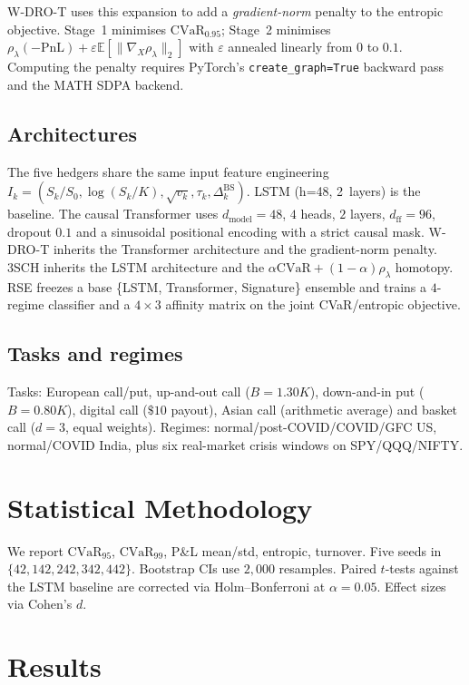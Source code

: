 \documentclass[10pt,twocolumn]{article}
\newcommand{\E}{\mathbb{E}}
\newcommand{\cvar}{\mathrm{CVaR}}
\begin{document}
W-DRO-T uses this expansion to add a \emph{gradient-norm} penalty to the
entropic objective.  Stage~1 minimises $\cvar_{0.95}$; Stage~2 minimises
$\rho_\lambda(-\mathrm{PnL}) + \varepsilon\E[\|\nabla_X\rho_\lambda\|_2]$
with $\varepsilon$ annealed linearly from $0$ to $0.1$.  Computing the
penalty requires PyTorch's \texttt{create\_graph=True} backward pass and
the MATH SDPA backend.

\subsection{Architectures}

The five hedgers share the same input feature engineering $I_k = (S_k/S_0,
\log(S_k/K), \sqrt{v_k}, \tau_k, \Delta_k^{\mathrm{BS}})$.  LSTM (h=48,
2~layers) is the baseline.  The causal Transformer uses
$d_{\text{model}}=48$, $4$ heads, $2$ layers, $d_{\text{ff}}=96$, dropout
$0.1$ and a sinusoidal positional encoding with a strict causal mask.
W-DRO-T inherits the Transformer architecture and the gradient-norm
penalty.  3SCH inherits the LSTM architecture and the
$\alpha\cvar+(1-\alpha)\rho_\lambda$ homotopy.  RSE freezes a base
\{LSTM, Transformer, Signature\} ensemble and trains a $4$-regime
classifier and a $4{\times}3$ affinity matrix on the joint CVaR/entropic
objective.

\subsection{Tasks and regimes}

Tasks: European call/put, up-and-out call ($B = 1.30K$), down-and-in put
($B=0.80K$), digital call ($\$10$ payout), Asian call (arithmetic average)
and basket call ($d=3$, equal weights).  Regimes: normal/post-COVID/COVID/GFC
US, normal/COVID India, plus six real-market crisis windows on SPY/QQQ/NIFTY.

\section{Statistical Methodology}
\label{sec:stats}
We report $\cvar_{95}$, $\cvar_{99}$, P\&L mean/std, entropic, turnover.
Five seeds in $\{42,142,242,342,442\}$.  Bootstrap CIs use $2{,}000$
resamples.  Paired $t$-tests against the LSTM baseline are corrected via
Holm--Bonferroni at $\alpha=0.05$.  Effect sizes via Cohen's $d$.

\section{Results}
\label{sec:results}
\end{document}
